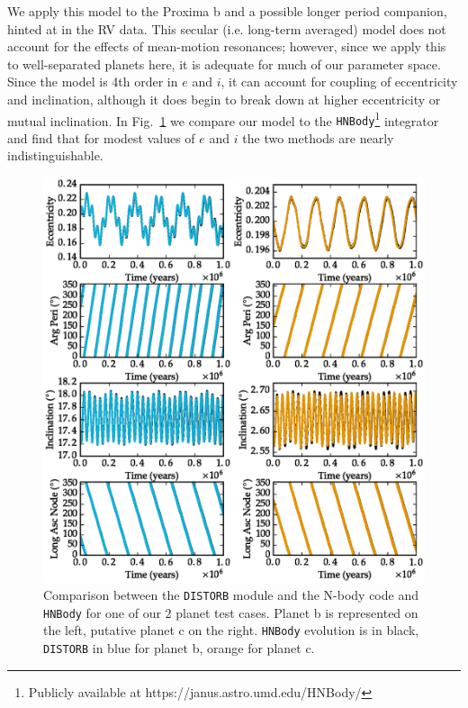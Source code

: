 \documentclass[preprint,12pt]{aastex}
\newcommand{\xxx}[1]{{\color{red} #1}} %
\def\distorb{\texttt{\footnotesize{DISTORB}}\xspace}
\begin{document}
We apply this model to the Proxima b and a possible longer period
companion, hinted at in the RV data. This secular (i.e. long-term
averaged) model does not account for the effects of mean-motion
resonances; however, since we apply this to well-separated planets
here, it is adequate for much of our parameter space. Since the model
is 4th order in $e$ and $i$, it can account for coupling of
eccentricity and inclination, although it does begin to break down at
higher eccentricity or mutual inclination. In
Fig.~\ref{fig:orbitvalid} we compare our model to the
{\footnotesize \texttt{HNBody}}\footnote{\xxx{Publicly available at
 https://janus.astro.umd.edu/HNBody/}}
integrator \citep{RauchHamilton02} and find that for modest values of
$e$ and $i$ the two methods are nearly indistinguishable.
 
\begin{figure}
\includegraphics[width=\textwidth]{orbcomp_mid_e_i.eps}
\caption{Comparison between the \distorb module and the N-body code and 
   {\footnotesize \texttt{HNBody}} for one of our 2
   planet test cases. Planet b is represented on the left, putative
   planet c on the right. {\footnotesize \texttt{HNBody}} evolution is in 
   black, \distorb in blue for planet b, orange for planet c.}
\label{fig:orbitvalid}
\end{figure} 
\end{document}
